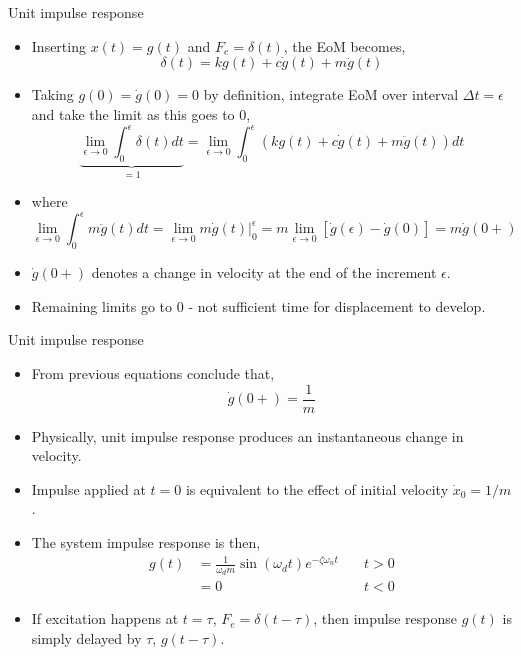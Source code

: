 \documentclass[11pt,aspectratio=169,handout]{beamer}
\begin{document}
\begin{frame}[c]{Unit impulse response}
	\begin{itemize}
		\item<1->  Inserting $x(t) = g(t)$ and $F_e=\delta(t)$, the EoM becomes, 
		\begin{equation}\label{}
			\delta(t) =  kg(t) + c\dot{g}(t) +  m\ddot{g}(t) 
		\end{equation}
	\item<2-> Taking $g(0)=\dot{g}(0) = 0$ by definition, integrate EoM over interval $\Delta t=\epsilon$ and take the limit as this goes to $0$,
	\begin{equation}\label{}
	\underbrace{	\lim_{\epsilon\rightarrow 0} \int_0^\epsilon \delta(t)  dt }_{=1}=  	\lim_{\epsilon\rightarrow 0} \int_0^\epsilon \left(kg(t) + c\dot{g}(t) +  m\ddot{g}(t) \right)dt
	\end{equation}\vspace{-0.6cm}
	\item[]<3->where 
	\begin{equation}
		\lim_{\epsilon\rightarrow 0} \int_0^\epsilon m\ddot{g}(t)dt = \lim_{\epsilon\rightarrow 0} m\dot{g}(t)\Big|_0^\epsilon = m \lim_{\epsilon\rightarrow 0} [\dot{g}(\epsilon) - \dot{g}(0)] = m\dot{g}(0+)
	\end{equation}
\item<3-> $\dot{g}(0+)$ denotes a change in velocity at the end of the increment $\epsilon$.
\item<4-> Remaining limits go to 0 - not sufficient time for displacement to develop.
	\end{itemize}
\end{frame}

\begin{frame}[c]{Unit impulse response}
	\begin{itemize}
		\item<1-> From previous equations conclude that, 
		\begin{equation}
			\dot{g}(0+) = \frac{1}{m}
		\end{equation}
	\item<2-> Physically, unit impulse response produces an instantaneous change in velocity.
	\item<3-> Impulse applied at $t=0$ is equivalent  to the effect of initial velocity $\dot{x}_0=1/m$.
	\item<4-> The system impulse response is then, 
	\begin{align}
		g(t) &= \frac{1}{\omega_d m} \sin(\omega_d t) e^{-\zeta\omega_n t}  \quad  &t>0 \\
		&=0 &t<0
	\end{align}
\item<4-> If excitation happens at $t=\tau$, $F_e = \delta(t-\tau)$, then impulse response $g(t)$ is simply delayed by $\tau$, $g(t-\tau)$.
	\end{itemize}
\end{frame}
\end{document}
